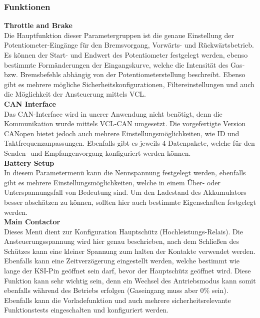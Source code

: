 \subsubsection{Funktionen}
\textbf{Throttle and Brake}\\[1mm]
Die Hauptfunktion dieser Parametergruppen ist die genaue Einstellung der Potentiometer-Eingänge für den Bremsvorgang, Vorwärts- und Rückwärtsbetrieb. Es können der Start- und Endwert des Potentiometer festgelegt werden, ebenso bestimmte Formänderungen der Eingangskurve, welche die Intensität des Gas- bzw. Bremsbefehls abhängig von der Potentiometerstellung beschreibt. Ebenso gibt es mehrere mögliche Sicherheitskonfigurationen, Filtereinstellungen und auch die Möglichkeit der Ansteuerung mittels VCL.\\[3mm]

\textbf{CAN Interface}\\[1mm]
Das CAN-Interface wird in unerer Anwendung nicht benötigt, denn die Kommunikation wurde mittels VCL-CAN umgesetzt. Die vorgefertigte Version CANopen bietet jedoch auch mehrere Einstellungsmöglichkeiten, wie ID und Taktfrequenzanpassungen. Ebenfalls gibt es jeweils 4 Datenpakete, welche für den Senden- und Empfangenvorgang konfiguriert werden können.
\\[3mm]

\textbf{Battery Setup}\\[1mm]
In diesem Parametermenü kann die Nennspannung festgelegt werden, ebenfalls gibt es mehrere Einstellungsmöglichkeiten, welche in einem Über- oder Unterspannungsfall von Bedeutung sind. Um den Ladestand des Akkumulators besser abschätzen zu können, sollten hier auch bestimmte Eigenschaften festgelegt werden.
\\[3mm]

\textbf{Main Contactor}\\[1mm]
Dieses Menü dient zur Konfiguration Hauptschütz (Hochleistungs-Relais). Die Ansteuerungsspannung wird hier genau beschrieben, nach dem Schließen des Schützes kann eine kleiner Spannung zum halten der Kontakte verwendet werden. Ebenfalls kann eine Zeitverzögerung eingestellt werden, welche bestimmt wie lange der KSI-Pin geöffnet sein darf, bevor der Hauptschütz geöffnet wird. Diese Funktion kann sehr wichtig sein, denn ein Wechsel des Antriebsmodus kann somit ebenfalls während des Betriebs erfolgen (Gaseingang muss aber 0\% sein). Ebenfalls kann die Vorladefunktion und auch mehrere sicherheitsrelevante Funktionstests eingeschalten und konfiguriert werden.


